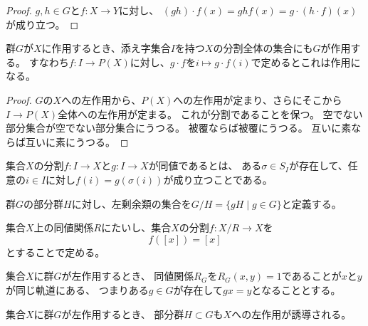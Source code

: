 \begin{proof}
    $g, h\in G$と$f:X\to Y$に対し、
    $(gh)\cdot f(x)=ghf(x)=g\cdot(h\cdot f)(x)$が成り立つ。
\end{proof}

\begin{proposition}
    \label{decomp-action}
    群$G$が$X$に作用するとき、添え字集合$I$を持つ$X$の分割全体の集合にも$G$が作用する。
    すなわち$f:I\to P(X)$に対し、$g\cdot f$を$i\mapsto g\cdot f(i)$で定めるとこれは作用になる。
\end{proposition}

\begin{proof}
    $G$の$X$への左作用から、$P(X)$への左作用が定まり、さらにそこから$I\to P(X)$全体への左作用が定まる。
    これが分割であることを保つ。
    空でない部分集合が空でない部分集合にうつる。
    被覆ならば被覆にうつる。
    互いに素ならば互いに素にうつる。
\end{proof}

\begin{proposition}
    \label{decomp-equiv}
    集合$X$の分割$f:I\to X$と$g:I\to X$が同値であるとは、
    ある$\sigma\in S_I$が存在して、任意の$i\in I$に対し$f(i)=g(\sigma(i))$が成り立つことである。
\end{proposition}

\begin{definition}
    \label{quotient-def}
    群$G$の部分群$H$に対し、左剰余類の集合を$G/H=\{gH\mid g\in G\}$と定義する。
\end{definition}

\begin{proposition}\label{equivrel-to-decomp}
    集合$X$上の同値関係$R$にたいし、集合$X$の分割$f:X/R \to X$を
    $$f([x])=[x]$$とすることで定める。
\end{proposition}

\begin{proposition}\label{group-action-to-equivrel}
    集合$X$に群$G$が左作用するとき、
    同値関係$R_G$を$R_G(x,y)=1$であることが$x$と$y$が同じ軌道にある、
    つまりある$g\in G$が存在して$gx=y$となることとする。
\end{proposition}

\begin{proposition}\label{subgroup-action}
    集合$X$に群$G$が左作用するとき、
    部分群$H\subset G$も$X$への左作用が誘導される。
\end{proposition}


